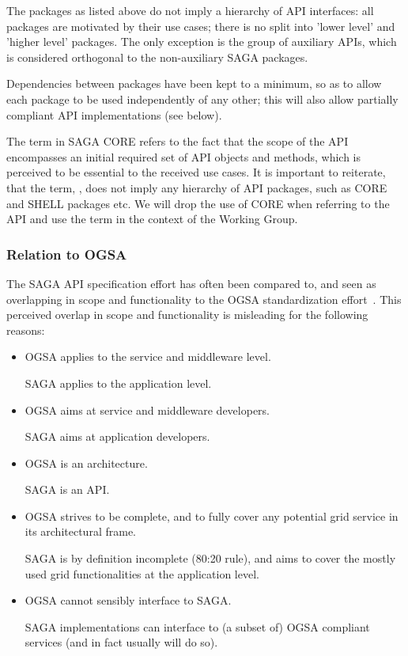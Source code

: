   The packages as listed above do not imply a hierarchy of API
  interfaces: all packages are motivated by their use cases; there is
  no split into 'lower level' and 'higher level' packages. The only
  exception is the group of auxiliary APIs, which is
  considered orthogonal to the non-auxiliary SAGA packages.

  Dependencies between packages have been kept to a minimum, so as to allow each package to be used
  independently of any other; this will also allow
  partially compliant API implementations (see below).
  
  The term  in SAGA CORE refers to the fact that the scope of
  the API encompasses an initial required set of API objects and
  methods, which is perceived to be essential to the received
  use cases.  It is important to reiterate, that the term,
  , does not imply any hierarchy of API packages, such as
  CORE and SHELL packages etc. We will drop the use of  CORE
  when referring to the API and use the term in the context of the
  Working Group.


 \subsubsection{Relation to OGSA}
 
 The SAGA API specification effort has often been compared to, and
 seen as overlapping in scope and functionality to the OGSA
 standardization effort~\cite{ogsa-gfd}.  This perceived overlap in scope and
   functionality is misleading for the following reasons:

  \begin{itemize}

    \item OGSA applies to the service and middleware level.

          SAGA applies to the application level.


    \item OGSA aims at service and middleware developers.

          SAGA aims at application developers.


    \item OGSA is an architecture.

          SAGA is an API.


    \item OGSA strives to be complete, and to fully cover any
          potential grid service in its 
          architectural frame.

          SAGA is by definition incomplete (80:20 rule), and aims
          to cover the mostly used grid
          functionalities at the application level.
          


    \item OGSA cannot sensibly interface to SAGA.

          SAGA implementations can interface to (a subset of)
          OGSA compliant services (and in fact usually will do
          so).

  \end{itemize}


